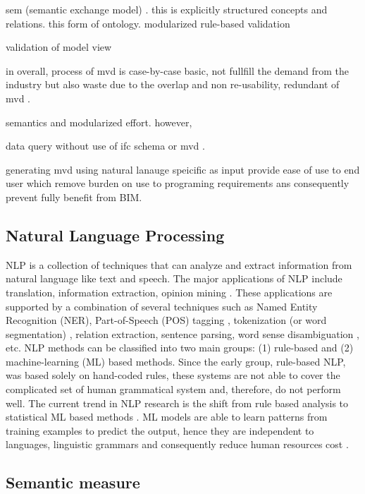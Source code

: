 \documentclass[Journal, InsideFigs, DoubleSpace]{ascelike} %
\begin{document}
sem (semantic exchange model) \cite{venugopal12a}. this is explicitly structured concepts and relations. this form of ontology.  modularized rule-based validation \cite{lee16}

validation of model view 

 in overall, process of mvd is case-by-case basic, not fullfill the demand from the industry but also waste due to the overlap and non re-usability, redundant of mvd \cite{zhang13}. 

semantics and modularized effort. however, 



data query without use of ifc schema or mvd \cite{won13}.

generating mvd using natural lanauge speicific as input provide ease of use to end user \cite{jiang15} which remove burden on use to programing requirements ans consequently prevent fully benefit from BIM. 

\subsection{Natural Language Processing}
NLP is a collection of techniques that can analyze and extract information from natural language like text and speech. The major applications of NLP include translation, information extraction, opinion mining \cite{Cambria14}. These applications are supported by a combination of several techniques such as Named Entity Recognition (NER), Part-of-Speech (POS) tagging \cite{Toutanova03,Cunningham02}, tokenization (or word segmentation) \cite{Webster92,Zhao11}, relation extraction, sentence parsing, word sense disambiguation \cite{Lesk86,Yarowsky95,Navigli09}, etc. NLP methods can be classified into two main groups: (1) rule-based and (2) machine-learning (ML) based methods. Since the early group, rule-based NLP, was based solely on hand-coded rules, these systems are not able to cover the complicated set of human grammatical system \cite{Marcus95} and, therefore, do not perform well. The current trend in NLP research is the shift from rule based analysis to statistical ML based methods \cite{Cambria14}. ML models are able to learn patterns from training examples to predict the output, hence they are independent to languages, linguistic grammars and consequently reduce human resources cost \cite{costa-jussa12}. 

\subsection{Semantic measure}
\end{document}
